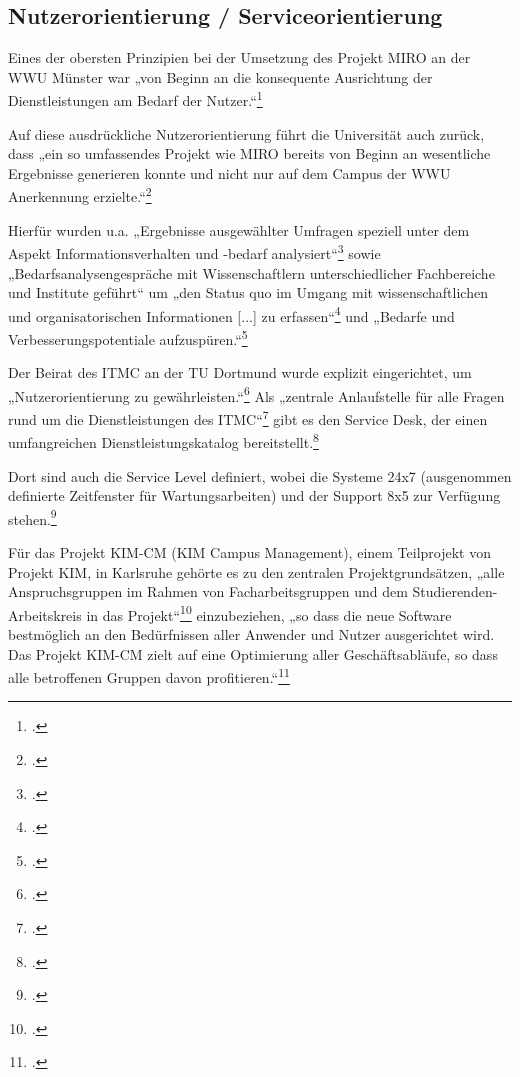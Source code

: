 \subsection{Nutzerorientierung / Serviceorientierung}
Eines der obersten Prinzipien bei der Umsetzung des Projekt MIRO an der WWU Münster war „von Beginn an die konsequente Ausrichtung der Dienstleistungen am Bedarf der Nutzer.“\footcite[19]{vogl_bericht_2013}

Auf diese ausdrückliche Nutzerorientierung führt die Universität auch zurück, dass „ein so umfassendes Projekt wie MIRO bereits von Beginn an wesentliche Ergebnisse generieren konnte und nicht nur auf dem Campus der WWU Anerkennung erzielte.“\footcite[19]{vogl_bericht_2013}

Hierfür wurden u.a. „Ergebnisse ausgewählter Umfragen speziell unter dem Aspekt Informationsverhalten und -bedarf analysiert“\footcite[19]{vogl_bericht_2013} sowie „Bedarfsanalysengespräche mit Wissenschaftlern unterschiedlicher Fachbereiche und Institute geführt“ um „den Status quo im Umgang mit wissenschaftlichen und organisatorischen Informationen [...] zu erfassen“\footcite[19]{vogl_bericht_2013} und „Bedarfe und Verbesserungspotentiale aufzuspüren.“\footcite[20]{vogl_bericht_2013}

\newpage

Der Beirat des ITMC an der TU Dortmund wurde explizit eingerichtet, um „Nutzerorientierung zu 
gewährleisten.“\footcite{tudortmund_itmc_beirat_2013} Als „zentrale Anlaufstelle für alle Fragen 
rund um die Dienstleistungen des ITMC“\footcite{tudortmund_support_service_desk_2013} gibt es 
den Service Desk, der einen umfangreichen Dienstleistungskatalog 
bereitstellt.\footcite{tudortmund_dienstleistungskatalog_2013}

Dort sind auch die Service Level definiert, wobei  die Systeme 24x7 (ausgenommen definierte Zeitfenster für Wartungsarbeiten) und der Support 8x5 zur 
Verfügung 
stehen.\footcite[7]{tudortmund_dienstleistungskatalog_2013}

Für das Projekt KIM-CM (KIM Campus Management), einem Teilprojekt von Projekt KIM, in Karlsruhe gehörte es zu den zentralen Projektgrundsätzen, „alle Anspruchsgruppen im Rahmen von Facharbeitsgruppen und dem Studierenden-Arbeitskreis in das Projekt“\footcite{kit_kim_auswirkungen_2013} einzubeziehen, „so dass die neue Software bestmöglich an den Bedürfnissen aller Anwender und Nutzer ausgerichtet wird. Das Projekt KIM-CM zielt auf eine Optimierung aller Geschäftsabläufe, so dass alle betroffenen Gruppen davon profitieren.“\footcite{kit_kim_auswirkungen_2013}

